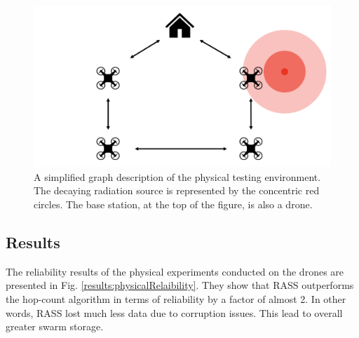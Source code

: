\begin{figure}
    \includegraphics[width=\textwidth]{figures/dora_mesh/lab_graph_left.png}
    \caption[RASS physical experiment schema]{A simplified graph description of the physical testing environment. The decaying radiation source is represented by the concentric red circles. The base station, at the top of the figure, is also a drone.}
    \label{cogniflyGraph}
\end{figure}


\subsection{Results}
The reliability results of the physical experiments conducted on the drones are presented in Fig. \ref{results:physicalRelaibility}. They show that \ac{RASS} outperforms the hop-count algorithm in terms of reliability by a factor of almost 2. In other words, \ac{RASS} lost much less data due to corruption issues. This lead to overall greater swarm storage. 

